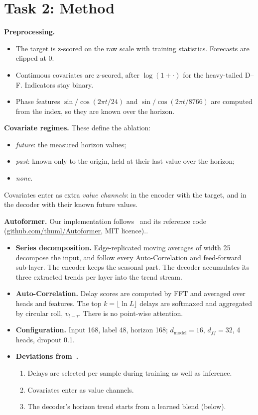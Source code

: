 \documentclass[11pt,a4paper]{article}
\begin{document}
\section{Task 2: Method}
\textbf{Preprocessing.}
\begin{itemize}
  \item The target is z-scored on the raw scale with training statistics. Forecasts are clipped at 0.
  \item Continuous covariates are z-scored, after $\log(1+\cdot)$ for the heavy-tailed D--F. Indicators stay binary.
  \item Phase features $\sin/\cos(2\pi t/24)$ and $\sin/\cos(2\pi t/8766)$ are computed from the index, so they are known over the horizon.
\end{itemize}

\noindent\textbf{Covariate regimes.} These define the ablation:
\begin{itemize}
  \item \emph{future}: the measured horizon values;
  \item \emph{past}: known only to the origin, held at their last value over the horizon;
  \item \emph{none}.
\end{itemize}
Covariates enter as extra \emph{value channels}: in the encoder with the target, and in the decoder with their known future values.

\noindent \textbf{Autoformer.} Our implementation follows~\cite{wu2021} and its reference code (\url{github.com/thuml/Autoformer}, MIT licence)..
\begin{itemize}
  \item \textbf{Series decomposition.} Edge-replicated moving averages of width 25 decompose the input, and follow every Auto-Correlation and feed-forward sub-layer. The encoder keeps the seasonal part. The decoder accumulates its three extracted trends per layer into the trend stream.
  \item \textbf{Auto-Correlation.} Delay scores are computed by FFT and averaged over heads and features. The top $k=\lfloor\ln L\rfloor$ delays are softmaxed and aggregated by circular roll, $v_{t-\tau}$. There is no point-wise attention.
  \item \textbf{Configuration.} Input 168, label 48, horizon 168; $d_{\text{model}}=16$, $d_{ff}=32$, 4 heads, dropout 0.1.
  \item \textbf{Deviations from~\cite{wu2021}.}
    \begin{enumerate}
      \item Delays are selected per sample during training as well as inference.
      \item Covariates enter as value channels.
      \item The decoder's horizon trend starts from a learned blend (below).
    \end{enumerate}
\end{itemize}
\end{document}
